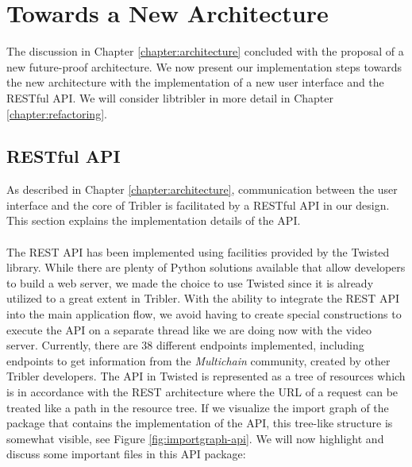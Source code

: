 \chapter{Towards a New Architecture}
\label{chapter:towards-new-architecture}
The discussion in Chapter \ref{chapter:architecture} concluded with the proposal of a new future-proof architecture. We now present our implementation steps towards the new architecture with the implementation of a new user interface and the RESTful API. We will consider libtribler in more detail in Chapter \ref{chapter:refactoring}.

\section{RESTful API}
As described in Chapter \ref{chapter:architecture}, communication between the user interface and the core of Tribler is facilitated by a RESTful API in our design. This section explains the implementation details of the API.\\\\
The REST API has been implemented using facilities provided by the Twisted library. While there are plenty of Python solutions available that allow developers to build a web server, we made the choice to use Twisted since it is already utilized to a great extent in Tribler. With the ability to integrate the REST API into the main application flow, we avoid having to create special constructions to execute the API on a separate thread like we are doing now with the video server. Currently, there are 38 different endpoints implemented, including endpoints to get information from the \emph{Multichain} community, created by other Tribler developers. The API in Twisted is represented as a tree of resources which is in accordance with the REST architecture where the URL of a request can be treated like a path in the resource tree. If we visualize the import graph of the package that contains the implementation of the API, this tree-like structure is somewhat visible, see Figure \ref{fig:importgraph-api}. We will now highlight and discuss some important files in this API package:
